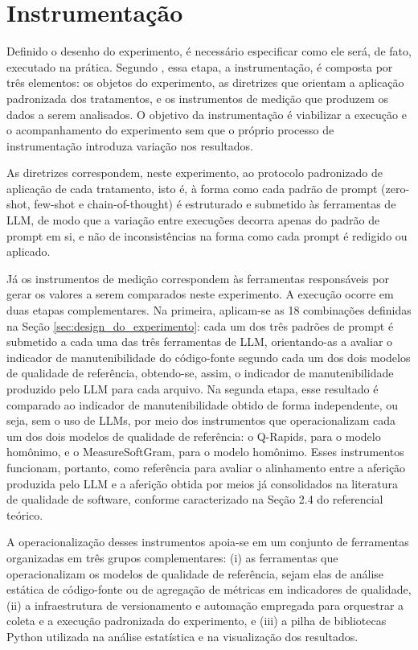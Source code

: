 \section{Instrumentação}
\label{sec:instrumentacao}

Definido o desenho do experimento, é necessário especificar como ele será, de fato, executado na prática. Segundo , essa etapa, a instrumentação, é composta por três elementos: os objetos do experimento, as diretrizes que orientam a aplicação padronizada dos tratamentos, e os instrumentos de medição que produzem os dados a serem analisados. O objetivo da instrumentação é viabilizar a execução e o acompanhamento do experimento sem que o próprio processo de instrumentação introduza variação nos resultados.

As diretrizes correspondem, neste experimento, ao protocolo padronizado de aplicação de cada tratamento, isto é, à forma como cada padrão de prompt (zero-shot, few-shot e chain-of-thought) é estruturado e submetido às ferramentas de LLM, de modo que a variação entre execuções decorra apenas do padrão de prompt em si, e não de inconsistências na forma como cada prompt é redigido ou aplicado.

Já os instrumentos de medição correspondem às ferramentas responsáveis por gerar os valores a serem comparados neste experimento. A execução ocorre em duas etapas complementares. Na primeira, aplicam-se as 18 combinações definidas na Seção \ref{sec:design_do_experimento}: cada um dos três padrões de prompt é submetido a cada uma das três ferramentas de LLM, orientando-as a avaliar o indicador de manutenibilidade do código-fonte segundo cada um dos dois modelos de qualidade de referência, obtendo-se, assim, o indicador de manutenibilidade produzido pelo LLM para cada arquivo. Na segunda etapa, esse resultado é comparado ao indicador de manutenibilidade obtido de forma independente, ou seja, sem o uso de LLMs, por meio dos instrumentos que operacionalizam cada um dos dois modelos de qualidade de referência: o Q-Rapids, para o modelo homônimo, e o MeasureSoftGram, para o modelo homônimo. Esses instrumentos funcionam, portanto, como referência para avaliar o alinhamento entre a aferição produzida pelo LLM e a aferição obtida por meios já consolidados na literatura de qualidade de software, conforme caracterizado na Seção 2.4 do referencial teórico.

A operacionalização desses instrumentos apoia-se em um conjunto de ferramentas organizadas em três grupos complementares: (i) as ferramentas que operacionalizam os modelos de qualidade de referência, sejam elas de análise estática de código-fonte ou de agregação de métricas em indicadores de qualidade, (ii) a infraestrutura de versionamento e automação empregada para orquestrar a coleta e a execução padronizada do experimento, e (iii) a pilha de bibliotecas Python utilizada na análise estatística e na visualização dos resultados.

